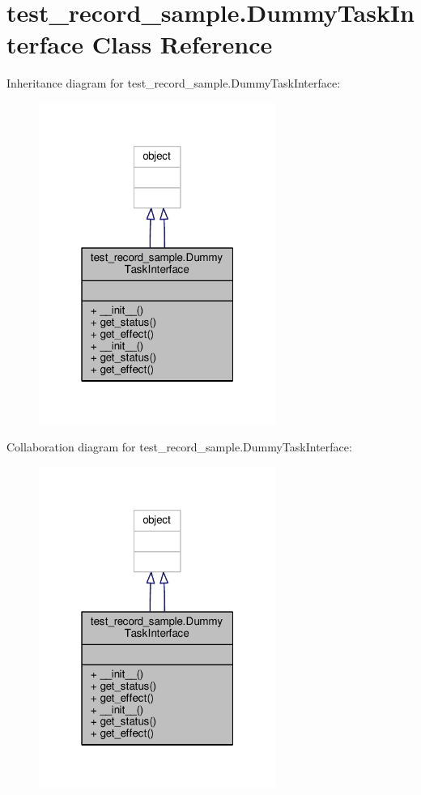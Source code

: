 \hypertarget{classtest__record__sample_1_1_dummy_task_interface}{\section{test\-\_\-record\-\_\-sample.\-Dummy\-Task\-Interface Class Reference}
\label{classtest__record__sample_1_1_dummy_task_interface}
}


Inheritance diagram for test\-\_\-record\-\_\-sample.\-Dummy\-Task\-Interface\-:\nopagebreak
\begin{figure}[H]
\begin{center}
\leavevmode
\includegraphics[width=220pt]{classtest__record__sample_1_1_dummy_task_interface__inherit__graph}
\end{center}
\end{figure}


Collaboration diagram for test\-\_\-record\-\_\-sample.\-Dummy\-Task\-Interface\-:\nopagebreak
\begin{figure}[H]
\begin{center}
\leavevmode
\includegraphics[width=220pt]{classtest__record__sample_1_1_dummy_task_interface__coll__graph}
\end{center}
\end{figure}
